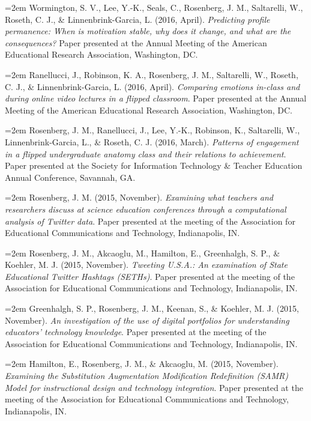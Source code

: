 \documentclass[
  14,
]{article}
\begin{document}
\hangindent=2em Wormington, S. V., Lee, Y.-K., Seals, C., Rosenberg, J.
M., Saltarelli, W., Roseth, C. J., \& Linnenbrink-Garcia, L. (2016,
April). \emph{Predicting profile permanence: When is motivation stable,
why does it change, and what are the consequences?} Paper presented at
the Annual Meeting of the American Educational Research Association,
Washington, DC.

\hangindent=2em Ranellucci, J., Robinson, K. A., Rosenberg, J. M.,
Saltarelli, W., Roseth, C. J., \& Linnenbrink-Garcia, L. (2016, April).
\emph{Comparing emotions in-class and during online video lectures in a
flipped classroom}. Paper presented at the Annual Meeting of the
American Educational Research Association, Washington, DC.

\hangindent=2em Rosenberg, J. M., Ranellucci, J., Lee, Y.-K., Robinson,
K., Saltarelli, W., Linnenbrink-Garcia, L., \& Roseth, C. J. (2016,
March). \emph{Patterns of engagement in a flipped undergraduate anatomy
class and their relations to achievement}. Paper presented at the
Society for Information Technology \& Teacher Education Annual
Conference, Savannah, GA.

\hangindent=2em Rosenberg, J. M. (2015, November). \emph{Examining what
teachers and researchers discuss at science education conferences
through a computational analysis of Twitter data}. Paper presented at
the meeting of the Association for Educational Communications and
Technology, Indianapolis, IN.

\hangindent=2em Rosenberg, J. M., Akcaoglu, M., Hamilton, E.,
Greenhalgh, S. P., \& Koehler, M. J. (2015, November). \emph{Tweeting
U.S.A.: An examination of State Educational Twitter Hashtags (SETHs)}.
Paper presented at the meeting of the Association for Educational
Communications and Technology, Indianapolis, IN.

\hangindent=2em Greenhalgh, S. P., Rosenberg, J. M., Keenan, S., \&
Koehler, M. J. (2015, November). \emph{An investigation of the use of
digital portfolios for understanding educators' technology knowledge}.
Paper presented at the meeting of the Association for Educational
Communications and Technology, Indianapolis, IN.

\hangindent=2em Hamilton, E., Rosenberg, J. M., \& Akcaoglu, M. (2015,
November). \emph{Examining the Substitution Augmentation Modification
Redefinition (SAMR) Model for instructional design and technology
integration}. Paper presented at the meeting of the Association for
Educational Communications and Technology, Indianapolis, IN.
\end{document}
